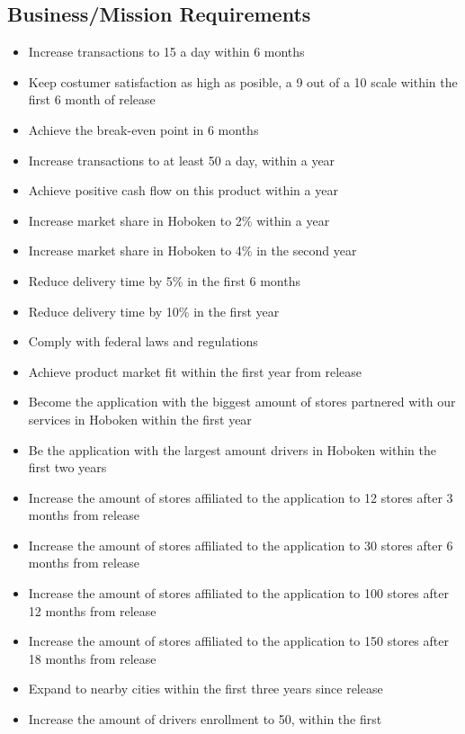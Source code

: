 \subsection{Business/Mission Requirements}
\begin{itemize}
    \item Increase transactions to 15 a day within 6 months
    \item Keep costumer satisfaction as high as posible, a 9 out of a 10 scale 
    within the first 6 month of release
    \item Achieve the break-even point in 6 months
    \item Increase transactions to at least 50 a day, within a year
    \item Achieve positive cash flow on this product within a year
    \item Increase market share in Hoboken to 2\% within a year
    \item Increase market share in Hoboken to 4\% in the second year
    \item Reduce delivery time by 5\% in the first 6 months
    \item Reduce delivery time by 10\% in the first year
    \item Comply with federal laws and regulations
    \item Achieve product market fit within the first year from release
    \item Become the application with the biggest amount of stores partnered 
    with our services in Hoboken within the first year
    \item Be the application with the largest amount drivers in Hoboken 
    within the first two years
    \item Increase the amount of stores affiliated to the application to 12 
    stores after 3 months from release
    \item Increase the amount of stores affiliated to the application to 30 
    stores after 6 months from release
    \item Increase the amount of stores affiliated to the application to 100 
    stores after 12 months from release
    \item Increase the amount of stores affiliated to the application to 150 
    stores after 18 months from release
    \item Expand to nearby cities within the first three years since release
    \item Increase the amount of drivers enrollment to 50, within the first 

\end{itemize}
